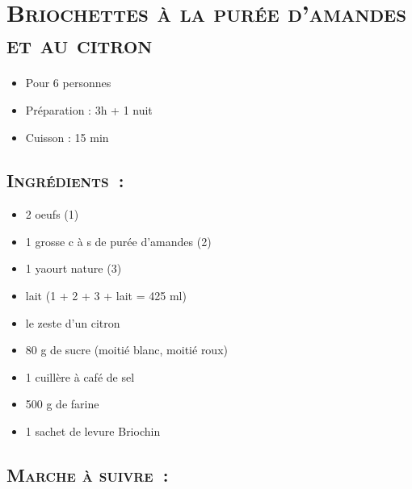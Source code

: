 \section[\normalsize{Briochettes \`a la pur\'ee d'amandes et au citron}]{\LARGE{\textsc{Briochettes \`a la pur\'ee d'amandes et au citron}}}		%


\begin{itemize}
\item Pour 6 personnes
\item Préparation : 3h + 1 nuit
\item Cuisson : 15 min
\end{itemize}

\subsection*{\textsc{Ingr\'edients~:}}

\begin{itemize}
\item 2 oeufs (1)
\item 1 grosse c \`a s de pur\'ee d'amandes (2)
\item 1 yaourt nature (3)
\item lait (1 + 2 + 3 + lait = 425 ml)
\item le zeste d'un citron
\item 80 g de sucre (moiti\'e blanc, moiti\'e roux)
\item 1 cuill\`ere \`a caf\'e de sel
\item 500 g de farine
\item 1 sachet de levure Briochin 
\end{itemize}


\subsection*{\textsc{Marche \`a suivre~:}}

